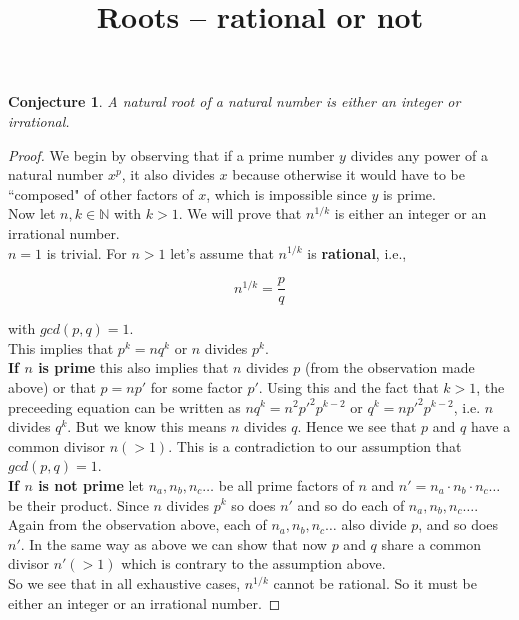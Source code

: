 \documentclass{article}
\title{Roots – rational or not}
\newtheorem*{conjecture}{Conjecture}
\newtheorem*{corollary}{Corollary}
\begin{document}
\maketitle

\begin{conjecture}A natural root of a natural number is either
    an integer or irrational.
\end{conjecture}
\begin{proof}We begin by observing that if a prime number $y$ 
    divides any power of a natural number $x^p$, it also divides 
    $x$ because otherwise it would have to be ``composed" of other
    factors of $x$, which is impossible since $y$ is prime.\\

    Now let $n,k\in\mathbb{N}$ with $k>1$. We will prove 
    that $n^{1/k}$ is either an integer or an irrational number.\\

    $n=1$ is trivial. For $n>1$ let's assume that 
    $n^{1/k}$ is \textbf{rational}, i.e.,
    
    $$n^{1/k} = \frac{p}{q}$$

    with $gcd(p,q) = 1$.\\

    This implies that $p^k = nq^k$ or $n$ divides $p^k$.\\

    \textbf{If $n$ is prime}
    this also implies that $n$ divides $p$ (from the observation made above)
    or that $p=np'$ for some factor $p'$.
    Using this and the fact that $k>1$, the preceeding
    equation can be written as $nq^k = n^2{p'}^2 p^{k-2}$
    or $q^k = n{p'}^2 p^{k-2}$, i.e. $n$ divides $q^k$. 
    But we know this means $n$ divides $q$. Hence we see that
    $p$ and $q$ have a common divisor $n(>1)$. This is a contradiction
    to our assumption that $gcd(p,q)=1$.\\

    \textbf{If $n$ is not prime}
    let $n_a,n_b,n_c\dots$ be all prime factors of $n$
    and $n' = n_a \cdot n_b \cdot n_c\dots$ be their product.
    Since $n$ divides $p^k$ so does $n'$ and so do each of $n_a,n_b,n_c\dots$.
    Again from the observation above, each of $n_a,n_b,n_c\dots$
    also divide $p$, and so does $n'$. In the same way as above
    we can show that now $p$ and $q$ share a common divisor
    $n'(>1)$ which is contrary to the assumption above.\\

    So we see that in all exhaustive cases, $n^{1/k}$ cannot be
    rational. So it must be either an integer or an irrational number.
\end{proof}
    
% 
    
\end{document}
